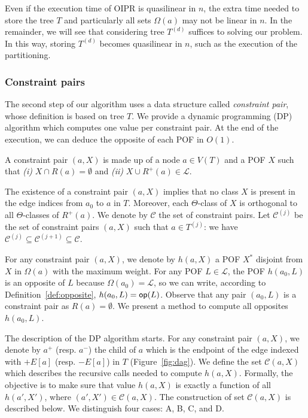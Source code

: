 \documentclass[a4paper,UKenglish,numberwithinsect,cleveref, autoref]{lipics-v2021}
\newcommand{\opp}{\mbox{\textsf{op}}}
\begin{document}
Even if the execution time of OIPR is quasilinear in $n$, the extra time needed to store the tree $T$ and particularly all sets $\Omega(a)$ may not be linear in $n$. In the remainder, we will see that considering tree $T^{(d)}$ suffices to solving our problem. In this way, storing $T^{(d)}$ becomes quasilinear in $n$, such as the execution of the partitioning.

\subsubsection{Constraint pairs} \label{subsubsec:cp}

The second step of our algorithm uses a data structure called \textit{constraint pair}, whose definition is based on tree $T$. We provide a dynamic programming (DP) algorithm which computes one value per constraint pair. At the end of the execution, we can deduce the opposite of each POF in $O(1)$.

\begin{definition}
A constraint pair $(a,X)$ is made up of a node $a \in V(T)$ and a POF $X$ such that {\em (i)} $X \cap R(a) = \emptyset$ and {\em (ii)} $X \cup R^+(a) \in \mathcal{L}$.
\label{def:cp}
\end{definition}

The existence of a constraint pair $(a,X)$ implies that no class $X$ is present in the edge indices from $a_0$ to $a$ in $T$. Moreover, each $\Theta$-class of $X$ is orthogonal to all $\Theta$-classes of $R^+(a)$. We denote by $\mathcal{C}$ the set of constraint pairs. Let $\mathcal{C}^{(j)}$ be the set of constraint pairs $(a,X)$ such that $a\in T^{(j)}$: we have $\mathcal{C}^{(j)} \subseteq \mathcal{C}^{(j+1)} \subseteq \mathcal{C}$.

For any constraint pair $(a,X)$, we denote by $h(a,X)$ a POF $X^*$ disjoint from $X$ in $\Omega(a)$ with the maximum weight. For any POF $L \in \mathcal{L}$, the POF $h(a_0,L)$ is an opposite of $L$ because $\Omega(a_0) = \mathcal{L}$, so we can write, according to Definition~\ref{def:opposite}, $h(a_0,L) = \opp(L)$. Observe that any pair $(a_0,L)$ is a constraint pair as $R(a) = \emptyset$. We present a method to compute all opposites $h(a_0,L)$.

The description of the DP algorithm starts. For any constraint pair $(a,X)$, we denote by $a^+$ (resp. $a^-$) the child of $a$ which is the endpoint of the edge indexed with $+E\left[a\right]$ (resp. $-E\left[a\right]$) in $T$ (Figure~\ref{fig:dag}). 
We define the set $\mathcal{C}(a,X)$ which describes the recursive calls needed to compute $h(a,X)$. Formally, the objective is to make sure that value $h(a,X)$ is exactly a function of all $h(a',X')$, where $(a',X') \in \mathcal{C}(a,X)$.
The construction of set $\mathcal{C}(a,X)$ is described below. We distinguish four cases: A, B, C, and D.
\end{document}
